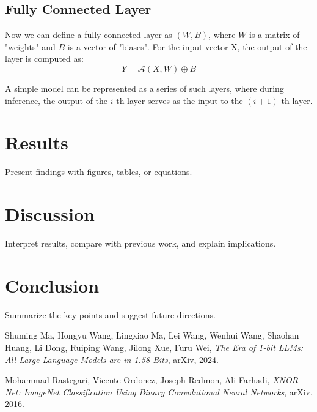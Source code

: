 \documentclass{article}
\begin{document}
\subsection{Fully Connected Layer}
Now we can define a fully connected layer as \( (W, B) \), where \( W \) is a matrix of "weights" and \( B \) is a vector of "biases". For the input vector X, the output of the layer is computed as:
\[ Y = \mathcal{A}(X, W) \oplus B \]

A simple model can be represented as a series of such layers, where during inference, the output of the \( i \)-th layer serves as the input to the \( (i+1) \)-th layer.

\section{Results}
Present findings with figures, tables, or equations.

\section{Discussion}
Interpret results, compare with previous work, and explain implications.

\section{Conclusion}
Summarize the key points and suggest future directions.

\begin{thebibliography}{9}

    Shuming Ma, Hongyu Wang, Lingxiao Ma, Lei Wang, Wenhui Wang, Shaohan Huang, Li Dong, Ruiping Wang, Jilong Xue, Furu Wei, \textit{The Era of 1-bit LLMs: All Large Language Models are in 1.58 Bits}, arXiv, 2024.

    Mohammad Rastegari, Vicente Ordonez, Joseph Redmon, Ali Farhadi, \textit{XNOR-Net: ImageNet Classification Using Binary Convolutional Neural Networks}, arXiv, 2016.

\end{thebibliography}
\end{document}
